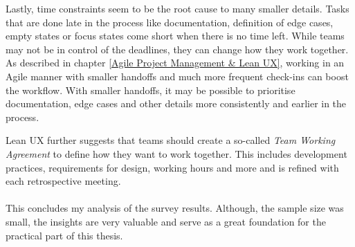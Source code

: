 Lastly, time constraints seem to be the root cause to many smaller details. Tasks that are done late
in the process like documentation, definition of edge cases, empty states or focus states come short
when there is no time left. While teams may not be in control of the deadlines, they can change how
they work together. As described in chapter \ref{Agile Project Management & Lean UX}, working in an
Agile manner with smaller handoffs and much more frequent check-ins can boost the workflow. With
smaller handoffs, it may be possible to prioritise documentation, edge cases and other details more
consistently and earlier in the process. 

Lean UX further suggests that teams should create a so-called \textit{Team Working Agreement} to
define how they want to work together. This includes development practices, requirements for design,
working hours and more and is refined with each retrospective meeting. 
 \\\\ 

This concludes my analysis of the survey results. Although, the sample size was small, the insights
are very valuable and serve as a great foundation for the practical part of this thesis.
